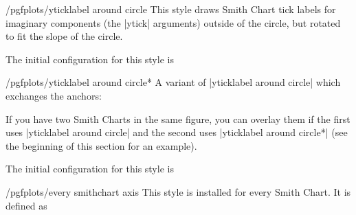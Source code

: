 \begin{stylekey}{/pgfplots/yticklabel around circle}
	This style draws Smith Chart tick labels for imaginary components (the |ytick| arguments) outside of the circle, but rotated to fit the slope of the circle.
\begin{codeexample}[]
\end{codeexample}

	The initial configuration for this style is
\begin{codeexample}
\end{codeexample}
\end{stylekey}

\begin{stylekey}{/pgfplots/yticklabel around circle*}
	A variant of |yticklabel around circle| which exchanges the anchors:
\begin{codeexample}[]
\end{codeexample}
	If you have two Smith Charts in the same figure, you can overlay them if the first uses |yticklabel around circle| and the second uses |yticklabel around circle*| (see the beginning of this section for an example).

	The initial configuration for this style is
\begin{codeexample}
\end{codeexample}
\end{stylekey}

\begin{stylekey}{/pgfplots/every smithchart axis}
	This style is installed for every Smith Chart. It is defined as
\begin{codeexample}
\end{codeexample}
\end{stylekey}

